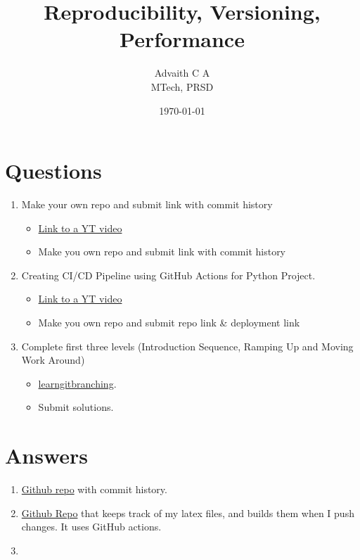 \documentclass{article}
\title{Reproducibility, Versioning, Performance}
\author{Advaith C A \\MTech, PRSD}
\date{\today}
\begin{document}
    \maketitle
    \section*{Questions}
    \begin{enumerate}
        \item Make your own repo and submit link with commit history
        \begin{itemize}
            \item \href{https://www.youtube.com/watch?v=8Dd7KRpKeaE}{Link to a YT video}
            \item Make you own repo and submit link with commit history
        \end{itemize}
        \item Creating CI/CD Pipeline using GitHub Actions for Python Project.
        \begin{itemize}
            \item \href{https://www.youtube.com/watch?v=WTofttoD2xg}{Link to a YT video}
            \item Make you own repo and submit repo link \& deployment link
        \end{itemize}
        \item Complete first three levels (Introduction Sequence, Ramping Up and Moving Work Around)
        \begin{itemize}
            \item \href{https://learngitbranching.js.org/}{learngitbranching}.
            \item Submit solutions.
        \end{itemize}
    \end{enumerate}

    \section*{Answers}
    \begin{enumerate}
        \item \href{https://github.com/advaithca/advaithca.github.io/tree/master}{Github repo} with commit history.
        \item \href{https://github.com/advaithca/latex_repo}{Github Repo} that keeps track of my latex files, and builds them when I push changes. It uses GitHub actions.
        \item 
    \end{enumerate}
\end{document}
